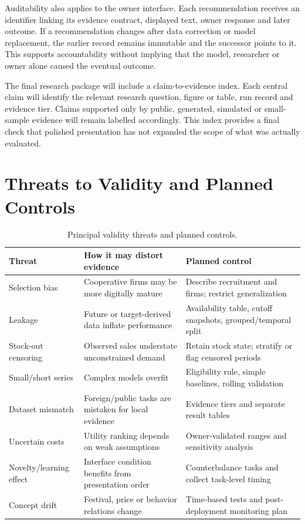 Auditability also applies to the owner interface. Each recommendation receives
an identifier linking its evidence contract, displayed text, owner response and
later outcome. If a recommendation changes after data correction or model
replacement, the earlier record remains immutable and the successor points to
it. This supports accountability without implying that the model, researcher or
owner alone caused the eventual outcome.

The final research package will include a claim-to-evidence index. Each central
claim will identify the relevant research question, figure or table, run record
and evidence tier. Claims supported only by public, generated, simulated or
small-sample evidence will remain labelled accordingly. This index provides a
final check that polished presentation has not expanded the scope of what was
actually evaluated.

\section{Threats to Validity and Planned Controls}

\begin{table}[H]
\centering
\small
\caption{Principal validity threats and planned controls.}
\label{tab:validity_controls}
\begin{tabularx}{\textwidth}{|p{}|p{}|Y|}
\hline
\textbf{Threat} & \textbf{How it may distort evidence} & \textbf{Planned control} \\
\hline
Selection bias & Cooperative firms may be more digitally mature & Describe recruitment and firms; restrict generalization \\
Leakage & Future or target-derived data inflate performance & Availability table, cutoff snapshots, grouped/temporal split \\
Stock-out censoring & Observed sales understate unconstrained demand & Retain stock state; stratify or flag censored periods \\
Small/short series & Complex models overfit & Eligibility rule, simple baselines, rolling validation \\
Dataset mismatch & Foreign/public tasks are mistaken for local evidence & Evidence tiers and separate result tables \\
Uncertain costs & Utility ranking depends on weak assumptions & Owner-validated ranges and sensitivity analysis \\
Novelty/learning effect & Interface condition benefits from presentation order & Counterbalance tasks and collect task-level timing \\
Concept drift & Festival, price or behavior relations change & Time-based tests and post-deployment monitoring plan \\
\hline
\end{tabularx}
\end{table}

